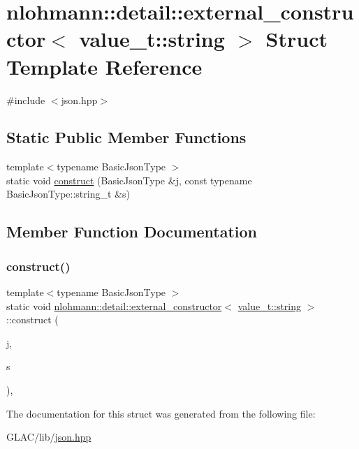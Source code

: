 \hypertarget{structnlohmann_1_1detail_1_1external__constructor_3_01value__t_1_1string_01_4}{}\section{nlohmann\+::detail\+::external\+\_\+constructor$<$ value\+\_\+t\+::string $>$ Struct Template Reference}
\label{structnlohmann_1_1detail_1_1external__constructor_3_01value__t_1_1string_01_4}


{\ttfamily \#include $<$json.\+hpp$>$}

\subsection*{Static Public Member Functions}
\begin{DoxyCompactItemize}
\item 
{\footnotesize template$<$typename Basic\+Json\+Type $>$ }\\static void \mbox{\hyperlink{structnlohmann_1_1detail_1_1external__constructor_3_01value__t_1_1string_01_4_ad88d0b4b7ea01ea20e12cc1b82fe0d92}{construct}} (Basic\+Json\+Type \&j, const typename Basic\+Json\+Type\+::string\+\_\+t \&s)
\end{DoxyCompactItemize}


\subsection{Member Function Documentation}
\mbox{\label{structnlohmann_1_1detail_1_1external__constructor_3_01value__t_1_1string_01_4_ad88d0b4b7ea01ea20e12cc1b82fe0d92}} 
\subsubsection{\texorpdfstring{construct()}{construct()}}
{\footnotesize\ttfamily template$<$typename Basic\+Json\+Type $>$ \\
static void \mbox{\hyperlink{structnlohmann_1_1detail_1_1external__constructor}{nlohmann\+::detail\+::external\+\_\+constructor}}$<$ \mbox{\hyperlink{namespacenlohmann_1_1detail_a90aa5ef615aa8305e9ea20d8a947980fab45cffe084dd3d20d928bee85e7b0f21}{value\+\_\+t\+::string}} $>$\+::construct (\begin{DoxyParamCaption}\item[{Basic\+Json\+Type \&}]{j,  }\item[{const typename Basic\+Json\+Type\+::string\+\_\+t \&}]{s }\end{DoxyParamCaption})\hspace{0.3cm}{\ttfamily [inline]}, {\ttfamily [static]}}



The documentation for this struct was generated from the following file\+:\begin{DoxyCompactItemize}
\item 
G\+L\+A\+C/lib/\mbox{\hyperlink{json_8hpp}{json.\+hpp}}\end{DoxyCompactItemize}
